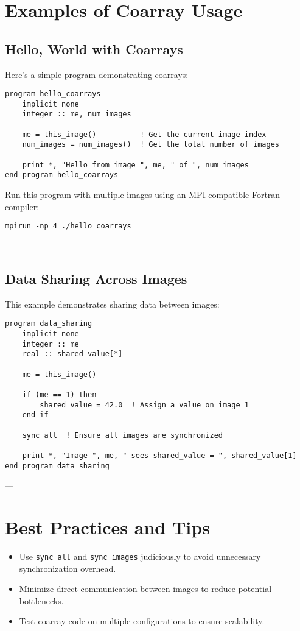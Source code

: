 \section{Examples of Coarray Usage}

\subsection{Hello, World with Coarrays}
Here’s a simple program demonstrating coarrays:
\begin{lstlisting}
program hello_coarrays
    implicit none
    integer :: me, num_images

    me = this_image()          ! Get the current image index
    num_images = num_images()  ! Get the total number of images

    print *, "Hello from image ", me, " of ", num_images
end program hello_coarrays
\end{lstlisting}

Run this program with multiple images using an MPI-compatible Fortran compiler:
\begin{verbatim}
mpirun -np 4 ./hello_coarrays
\end{verbatim}

---

\subsection{Data Sharing Across Images}
This example demonstrates sharing data between images:
\begin{lstlisting}
program data_sharing
    implicit none
    integer :: me
    real :: shared_value[*]

    me = this_image()

    if (me == 1) then
        shared_value = 42.0  ! Assign a value on image 1
    end if

    sync all  ! Ensure all images are synchronized

    print *, "Image ", me, " sees shared_value = ", shared_value[1]
end program data_sharing
\end{lstlisting}

---

\section{Best Practices and Tips}
\begin{itemize}
    \item Use \texttt{sync all} and \texttt{sync images} judiciously to avoid unnecessary synchronization overhead.
    \item Minimize direct communication between images to reduce potential bottlenecks.
    \item Test coarray code on multiple configurations to ensure scalability.
\end{itemize}

